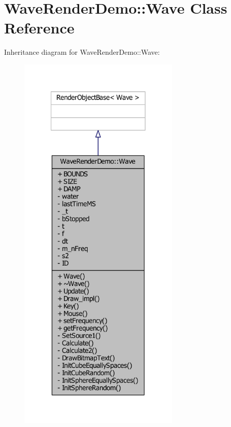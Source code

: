 \section{Wave\-Render\-Demo\-:\-:Wave Class Reference}
\label{classWaveRenderDemo_1_1Wave}


Inheritance diagram for Wave\-Render\-Demo\-:\-:Wave\-:\nopagebreak
\begin{figure}[H]
\begin{center}
\leavevmode
\includegraphics[width=218pt]{d6/dbe/classWaveRenderDemo_1_1Wave__inherit__graph}
\end{center}
\end{figure}


